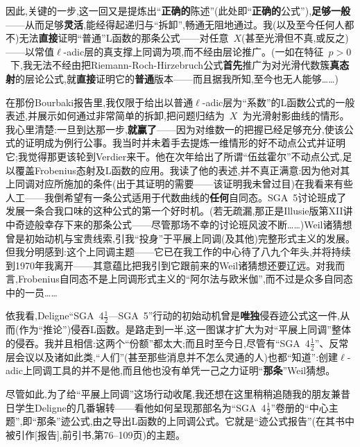 因此,关键的一步,这一回又是提炼出“\textbf{正确的}陈述”(此处即“\textbf{正确的}公式”),\textbf{足够一般}——从而足够\textbf{灵活},能经得起递归与“拆卸”,畅通无阻地通过。我(以及至今任何人都不)无法\textbf{直接}证明“普通”L函数的那条公式——对任意~$X$(甚至光滑但不真,或反之)——以常值$\ell$-adic层的真支撑上同调为项,而不经由层论推广。(一如在特征~$p>0$~下,我无法不经由把Riemann-Roch-Hirzebruch公式\textbf{首先}推广为对光滑代数簇\textbf{真态射}的层论公式,就\textbf{直接}证明它的\textbf{普通}版本——而且据我所知,至今也无人能够……)

\dmark{}在那份Bourbaki报告里,我仅限于给出以普通$\ell$-adic层为“系数”的L函数公式的一般表述,并展示如何通过非常简单的拆卸,把问题归结为~$X$~为光滑射影曲线的情形。我心里清楚:一旦到达那一步,\textbf{就赢了}——因为对维数一的把握已经足够充分,使该公式的证明成为例行公事。我当时并未着手去提炼一维情形的好不动点公式并证明它;我觉得那更该轮到Verdier来干。他在次年给出了所谓“伍兹霍尔”不动点公式,足以覆盖Frobenius态射及L函数的应用。我读了他的表述,并不真正满意:因为他对其上同调对应所施加的条件(出于其证明的需要——该证明我未曾过目)在我看来有些人工——我倒希望有一条公式适用于代数曲线的\textbf{任何}自同态。SGA~5讨论班成了发展一条合我口味的这种公式的第一个好时机。(若无疏漏,那正是Illusie版第XII讲中奇迹般幸存下来的那条公式——尽管那场不幸的讨论班风波不断……)Weil诸猜想曾是初始动机与宝贵线索,引我“投身”于平展上同调(及其他)完整形式主义的发展。但我分明感到:这个上同调主题——它已在我工作的中心待了八九个年头,并将持续到1970年我离开——其意蕴比把我引到它跟前来的Weil诸猜想还要辽远。对我而言,Frobenius自同态不是上同调形式主义的“阿尔法与欧米伽”,而不过是众多自同态中的一员……

依我看,Deligne“SGA~4$\frac{1}{2}$—SGA~5”行动的初始动机\dmark{}曾是\textbf{唯独}侵吞迹公式这一件,从而(作为“推论”)侵吞L函数。是路走到一半,这一图谋才扩大为对“平展上同调”整体的侵吞。我并且相信:这两个“份额”都太大;而且时至今日,尽管有“SGA~4$\frac{1}{2}$”、反常层会议以及诸如此类,“人们”(甚至那些消息并不怎么灵通的人)也都“知道”:创建$\ell$-adic上同调工具的并不是他,而且他也没有单凭一己之力证明“\textbf{那条}”Weil猜想。

尽管如此,为了给“平展上同调”这场行动收尾,我还想在这里稍稍追随我的朋友兼昔日学生Deligne的几番辗转——看他如何呈现那部名为“SGA~4$\frac{1}{2}$”卷册的“中心主题”,即“那条”迹公式,由之导出L函数的上同调公式。它就是“迹公式报告”(在其书中被引作[报告],前引书,第76--109页)的主题。


